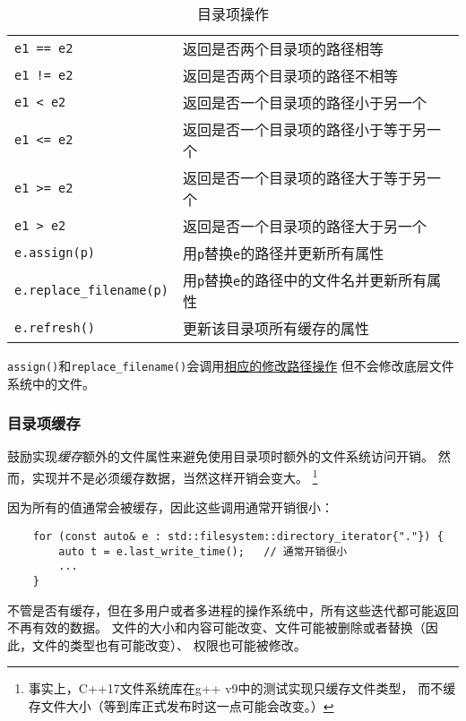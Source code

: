 \begin{table}[htb]
\begin{tabular}{l|l}
        \texttt{e1 == e2}                & 返回是否两个目录项的路径相等                            \\
        \texttt{e1 != e2}                & 返回是否两个目录项的路径不相等                           \\
        \texttt{e1 < e2}                 & 返回是否一个目录项的路径小于另一个                         \\
        \texttt{e1 <= e2}                & 返回是否一个目录项的路径小于等于另一个                       \\
        \texttt{e1 >= e2}                & 返回是否一个目录项的路径大于等于另一个                       \\
        \texttt{e1 > e2}                 & 返回是否一个目录项的路径大于另一个                         \\
        \texttt{e.assign(p)}             & 用\texttt{p}替换\texttt{e}的路径并更新所有属性         \\
        \texttt{e.replace\_filename(p)}  & 用\texttt{p}替换\texttt{e}的路径中的文件名并更新所有属性    \\
        \texttt{e.refresh()}             & 更新该目录项所有缓存的属性                             \\
        \hline
    \end{tabular}
    \caption{目录项操作}
    \label{t20.22}
\end{table}

\texttt{assign()}和\texttt{replace\_filename()}会调用\hyperref[ch20.3.5]{相应的修改路径操作}
但不会修改底层文件系统中的文件。

\subsubsection{目录项缓存}
鼓励实现\emph{缓存}额外的文件属性来避免使用目录项时额外的文件系统访问开销。
然而，实现并不是必须缓存数据，当然这样开销会变大。
\footnote{事实上，C++17文件系统库在g++ v9中的测试实现只缓存文件类型，
而不缓存文件大小（等到库正式发布时这一点可能会改变。）}

因为所有的值通常会被缓存，因此这些调用通常开销很小：
\begin{lstlisting}
    for (const auto& e : std::filesystem::directory_iterator{"."}) {
        auto t = e.last_write_time();   // 通常开销很小
        ...
    }
\end{lstlisting}
不管是否有缓存，但在多用户或者多进程的操作系统中，所有这些迭代都可能返回不再有效的数据。
文件的大小和内容可能改变、文件可能被删除或者替换（因此，文件的类型也有可能改变）、
权限也可能被修改。

